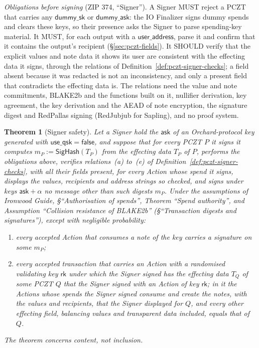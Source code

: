 \documentclass[11pt,a4paper]{article}
\newtheorem{theorem}{Theorem}[section]
\theoremstyle{definition}
\newcommand{\rk}{\mathsf{rk}}
\newcommand{\ask}{\ensuremath{\mathsf{ask}}}
\begin{document}
\emph{Obligations before signing} (ZIP 374, ``Signer''). A Signer MUST
reject a PCZT that carries any $\mathsf{dummy\_sk}$ or $\mathsf{dummy\_ask}$:
the IO Finalizer signs dummy spends and clears these keys, so their presence
asks the Signer to parse spending-key material. It MUST, for each output
with a $\mathsf{user\_address}$, parse it and confirm that it contains the
output's recipient (\S\ref{sec:pczt-fields}). It SHOULD verify that the
explicit values and note data it shows its user are consistent with the
effecting data it signs, through the relations of
Definition~\ref{def:pczt-signer-checks}; a field absent because it was
redacted is not an inconsistency, and only a present field that contradicts
the effecting data is. The relations need the value and note commitments,
BLAKE2b and the functions built on it, nullifier derivation, key agreement,
the key derivation and the AEAD of note encryption, the signature digest
and RedPallas signing (RedJubjub for Sapling), and no proof system.

\begin{theorem}[Signer safety]\label{thm:pczt-signer}
Let a Signer hold the $\ask$ of an Orchard-protocol key generated with
$\mathsf{use\_qsk} = \mathsf{false}$, and suppose that for every PCZT $P$ it
signs it computes $m_P := \mathsf{SigHash}(T_P)$ from the effecting data
$T_P$ of $P$, performs the obligations above, verifies relations~(a)
to~(e) of Definition~\ref{def:pczt-signer-checks}, with all their fields
present, for every Action whose spend it signs, displays the values,
recipients and address strings so checked, and signs under keys
$\ask + \alpha$ no message other than such digests $m_P$. Under the
assumptions of \emph{Ironwood Guide}, \S``Authorisation of spends'', Theorem
``Spend authority'', and Assumption ``Collision resistance of BLAKE2b''
(\S``Transaction digests and signatures''), except with negligible probability:
\begin{enumerate}[label=(\roman*)]
\item every accepted Action that consumes a note of the key carries a
  signature on some $m_P$;
\item every accepted transaction that carries an Action with a randomised
  validating key $\rk$ under which the Signer signed has the effecting data
  $T_Q$ of some PCZT $Q$ that the Signer signed with an Action of key
  $\rk$; in it the Actions whose spends the Signer signed consume and
  create the notes, with the values and recipients, that the Signer
  displayed for $Q$, and every other effecting field, balancing values and
  transparent data included, equals that of $Q$.
\end{enumerate}
The theorem concerns content, not inclusion.
\end{theorem}
\end{document}
